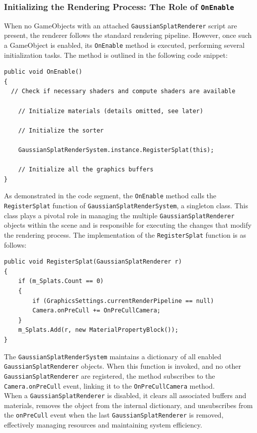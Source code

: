 \documentclass[12pt]{article}
\begin{document}
\subsubsection{Initializing the Rendering Process: The Role of \texttt{OnEnable}}
When no GameObjects with an attached \texttt{GaussianSplatRenderer} script are present, the renderer follows the standard rendering pipeline. However, once such a GameObject is enabled, its \texttt{OnEnable} method is executed, performing several initialization tasks. The method is outlined in the following code snippet:
\lstset{style=sharpc}
\begin{lstlisting}[tabsize=2,caption=\texttt{onEnable} of \texttt{GaussianSplatRenderer}, label=code:rendereronenable,breaklines=true,breakatwhitespace=true,basicstyle=\ttfamily\footnotesize]
public void OnEnable()
{
  // Check if necessary shaders and compute shaders are available

	// Initialize materials (details omitted, see later)
	
	// Initialize the sorter
	
	GaussianSplatRenderSystem.instance.RegisterSplat(this);
	
	// Initialize all the graphics buffers
}
\end{lstlisting}
As demonstrated in the code segment, the \texttt{OnEnable} method calls the \linebreak\texttt{RegisterSplat} function of \texttt{GaussianSplatRenderSystem}, a singleton class. This class plays a pivotal role in managing the multiple \linebreak\texttt{GaussianSplatRenderer} objects within the scene and is responsible for executing the changes that modify the rendering process. The implementation of the \texttt{RegisterSplat} function is as follows:
\begin{lstlisting}[tabsize=2,caption=\texttt{RegisterSplat} of \texttt{GaussianSplatRenderSystem}, label=code:systemregister,breaklines=true,breakatwhitespace=true,basicstyle=\ttfamily\footnotesize]
public void RegisterSplat(GaussianSplatRenderer r)
{
	if (m_Splats.Count == 0)
	{
		if (GraphicsSettings.currentRenderPipeline == null)
		Camera.onPreCull += OnPreCullCamera;
	}
	m_Splats.Add(r, new MaterialPropertyBlock());
}
\end{lstlisting}
The \texttt{GaussianSplatRenderSystem} maintains a dictionary of all enabled \linebreak\texttt{GaussianSplatRenderer} objects. When this function is invoked, and no other \texttt{GaussianSplatRenderer} are registered, the method subscribes to the \texttt{Camera.onPreCull} event, linking it to the \texttt{OnPreCullCamera} method.\\
When a \texttt{GaussianSplatRenderer} is disabled, it clears all associated buffers and materials, removes the object from the internal dictionary, and unsubscribes from the \texttt{onPreCull} event when the last \texttt{GaussianSplatRenderer} is removed, effectively managing resources and maintaining system efficiency.
\end{document}
